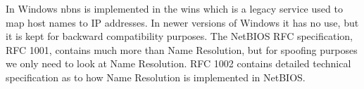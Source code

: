 \documentclass{article}
\begin{document}

\subsubsection{}
\label{sec:nbns}
In Windows \gls{nbns} is implemented in the \gls{wins} which is a legacy service used to map host names to IP addresses. In newer versions of Windows it has no use, but it is kept for backward compatibility purposes. The NetBIOS RFC specification, RFC 1001\cite{url:rfc:netbios}, contains much more than Name Resolution, but for spoofing purposes we only need to look at Name Resolution. RFC 1002\cite{url:rfc:netbios-technical} contains detailed technical specification as to how Name Resolution is implemented in NetBIOS. 

\end{document}

